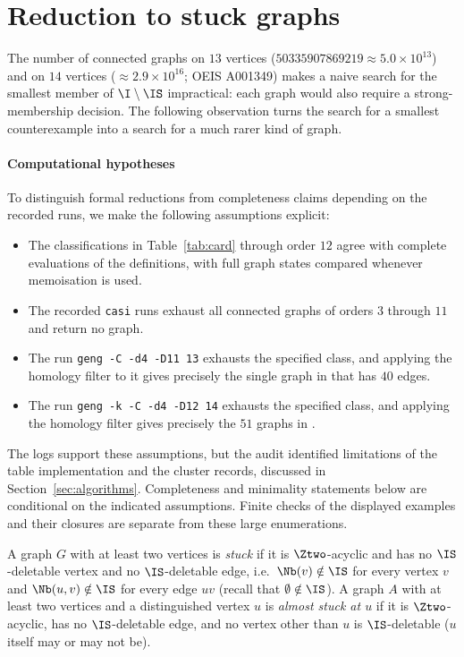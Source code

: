 \section{Reduction to stuck graphs}\label{sec:reduction}

The number of connected graphs on $13$ vertices ($\num{50335907869219}\approx 5.0\times 10^{13}$) and on $14$ vertices ($\approx 2.9\times 10^{16}$; OEIS A001349) makes a naive search for the smallest member of $\I\setminus\IS$ impractical: each graph would also require a strong-membership decision. The following observation turns the search for a smallest counterexample into a search for a much rarer kind of graph.

\paragraph{Computational hypotheses}\label{comp:hyp}
To distinguish formal reductions from completeness claims depending on the recorded runs, we make the following assumptions explicit:
\begin{itemize}[leftmargin=2em]
\item[$\mathrm{H12}$.] The classifications in Table~\ref{tab:card} through order $12$ agree with complete evaluations of the definitions, with full graph states compared whenever memoisation is used.
\item[$\mathrm{Hcasi}$.] The recorded \texttt{casi} runs exhaust all connected graphs of orders $3$ through $11$ and return no graph.
\item[$\mathrm{H13}$.] The run \texttt{geng -C -d4 -D11 13} exhausts the specified class, and applying the homology filter to it gives precisely the single graph in \protect{} that has $40$ edges.
\item[$\mathrm{H14}$.] The run \texttt{geng -k -C -d4 -D12 14} exhausts the specified class, and applying the homology filter gives precisely the $51$ graphs in \protect{}.
\end{itemize}
The logs support these assumptions, but the audit identified limitations of the table implementation and the cluster records, discussed in Section~\ref{sec:algorithms}. Completeness and minimality statements below are conditional on the indicated assumptions. Finite checks of the displayed examples and their closures are separate from these large enumerations.

\begin{definition}\label{def:stuck}
A graph $G$ with at least two vertices is \emph{stuck} if it is $\Ztwo$-acyclic and has no $\IS$-deletable vertex and no $\IS$-deletable edge, i.e.\ $\Nb(v)\notin\IS$ for every vertex $v$ and $\Nb(u,v)\notin\IS$ for every edge $uv$ (recall that $\emptyset\notin\IS$). A graph $A$ with at least two vertices and a distinguished vertex $u$ is \emph{almost stuck at $u$} if it is $\Ztwo$-acyclic, has no $\IS$-deletable edge, and no vertex other than $u$ is $\IS$-deletable ($u$ itself may or may not be).
\end{definition}

